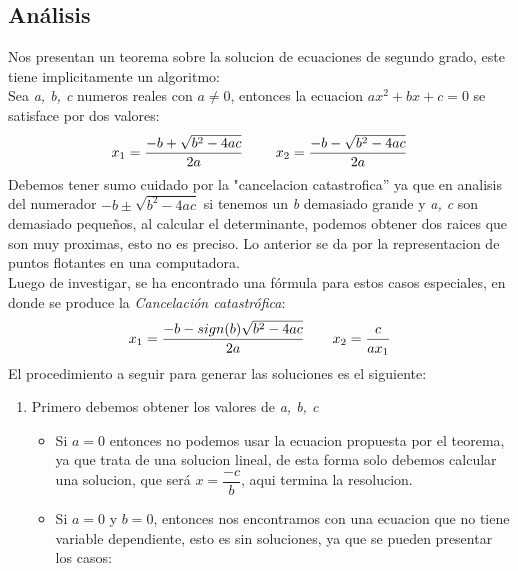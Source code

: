 \documentclass[spanish, fleqn]{article}
\begin{document}
\begin{enumerate}
    \section*{An\'alisis}
    	Nos presentan un teorema sobre la solucion de ecuaciones de segundo grado, este tiene implicitamente un algoritmo: \\
        	Sea \emph{a, b, c} numeros reales con $a \neq 0$, entonces la ecuacion
            $a x^2 + b x + c  = 0$ se satisface por dos valores:
            \begin{equation*}
              x_{1} = \frac{-b + \sqrt{b^2 - 4 a c}}{2 a} \ \ \ \ \ \ \ \ \\ 
              x_{2} = \frac{-b - \sqrt{b^2 - 4 a c}}{2 a}
            \end{equation*}
            Debemos tener sumo cuidado por la "cancelacion catastrofica'' ya que en analisis del numerador $-b \pm \sqrt{b^{2}-4 a c} $ si tenemos un \emph{b} demasiado grande y \emph{a, c} son demasiado pequeños, al calcular el determinante, podemos obtener dos raices que son muy proximas, esto no es preciso. Lo anterior se da por la representacion de puntos flotantes en una computadora. \\ 
            Luego de investigar, se ha encontrado una fórmula para estos casos especiales, en donde se produce la \emph{Cancelaci\'on catastr\'ofica}:
            \begin{equation*}
            x_{1} = \frac{-b - sign(b)\sqrt{b^{2} - 4 a c}}{2a} \ \ \ \ \ \ \ \\
            x_{2} = \frac{c}{a x_{1}}
            \end{equation*}
            El procedimiento a seguir para generar las soluciones es el siguiente:
            \begin{enumerate}
            \item Primero debemos obtener los valores de \emph{a, b, c}
            	\begin{itemize}
                \item Si $a = 0$ entonces no podemos usar la ecuacion propuesta por el teorema, ya que trata de una solucion lineal, de esta forma solo debemos calcular una solucion, que será $x = \dfrac{-c}{b}$, aqui termina la resolucion.
                \item Si $a = 0 $ y $b = 0$, entonces nos encontramos con una ecuacion que no tiene variable dependiente, esto es sin soluciones, ya que se pueden presentar los casos: 
                \begin{itemize}

\end{itemize}
\end{itemize}
\end{enumerate}
\end{enumerate}
\end{document}
